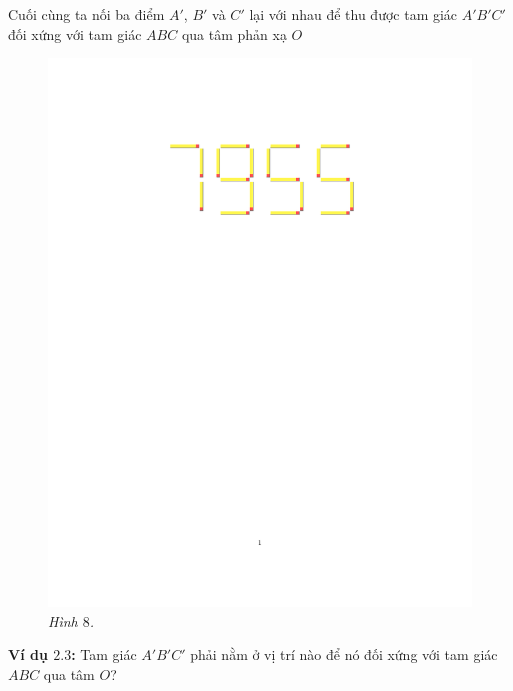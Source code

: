 \begin{multicols}{2}
\begin{figure}[H]
		\vspace*{-10pt}
	\end{figure}
	Cuối cùng ta nối ba điểm $A'$, $B'$ và $C'$ lại với nhau để thu được tam giác $A'B'C'$ đối xứng với tam giác $ABC$ qua tâm phản xạ $O$
	\begin{figure}[H]
		\vspace*{-5pt}
		\centering
		\captionsetup{labelformat= empty, justification=centering}
		\includegraphics[width= 1\linewidth]{8}
		\caption{\small\textit{\color{toancuabi}Hình $8$.}}
		\vspace*{-10pt}
	\end{figure}
	\textbf{\color{toancuabi}Ví dụ $\pmb{2.3}$:} Tam giác $A'B'C'$ phải nằm ở vị trí nào để nó đối xứng với tam giác $ABC$ qua tâm $O$? 
	\begin{figure}[H]
		\vspace*{-5pt}
		\centering
		\captionsetup{labelformat= empty, justification=centering}

\end{figure}
\end{multicols}
